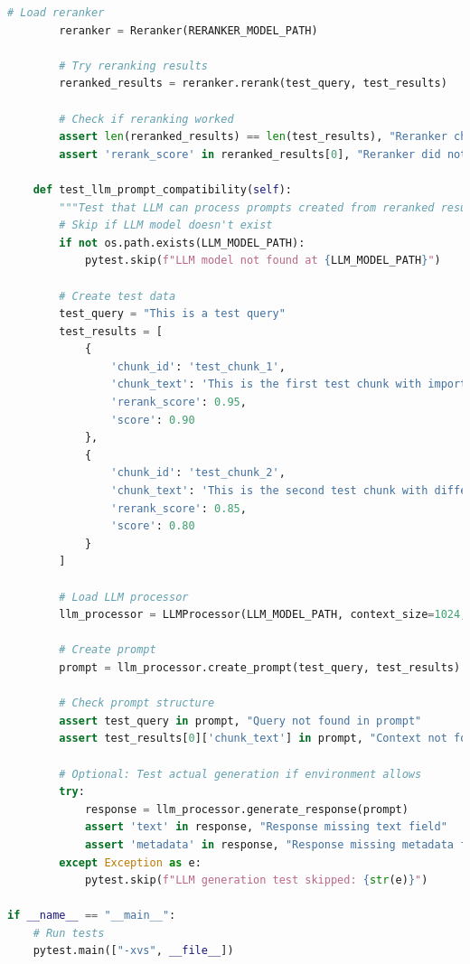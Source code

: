 \documentclass[
  screen,review,acmlarge]{acmart}
\begin{document}
\begin{lstlisting}[language=Python]
        # Load reranker
        reranker = Reranker(RERANKER_MODEL_PATH)
        
        # Try reranking results
        reranked_results = reranker.rerank(test_query, test_results)
        
        # Check if reranking worked
        assert len(reranked_results) == len(test_results), "Reranker changed the number of results"
        assert 'rerank_score' in reranked_results[0], "Reranker did not add scores"
    
    def test_llm_prompt_compatibility(self):
        """Test that LLM can process prompts created from reranked results."""
        # Skip if LLM model doesn't exist
        if not os.path.exists(LLM_MODEL_PATH):
            pytest.skip(f"LLM model not found at {LLM_MODEL_PATH}")
        
        # Create test data
        test_query = "This is a test query"
        test_results = [
            {
                'chunk_id': 'test_chunk_1',
                'chunk_text': 'This is the first test chunk with important information.',
                'rerank_score': 0.95,
                'score': 0.90
            },
            {
                'chunk_id': 'test_chunk_2',
                'chunk_text': 'This is the second test chunk with different information.',
                'rerank_score': 0.85,
                'score': 0.80
            }
        ]
        
        # Load LLM processor
        llm_processor = LLMProcessor(LLM_MODEL_PATH, context_size=1024, max_tokens=100)
        
        # Create prompt
        prompt = llm_processor.create_prompt(test_query, test_results)
        
        # Check prompt structure
        assert test_query in prompt, "Query not found in prompt"
        assert test_results[0]['chunk_text'] in prompt, "Context not found in prompt"
        
        # Optional: Test actual generation if environment allows
        try:
            response = llm_processor.generate_response(prompt)
            assert 'text' in response, "Response missing text field"
            assert 'metadata' in response, "Response missing metadata field"
        except Exception as e:
            pytest.skip(f"LLM generation test skipped: {str(e)}")
            
if __name__ == "__main__":
    # Run tests
    pytest.main(["-xvs", __file__])
\end{lstlisting}
\end{document}
